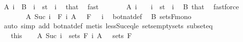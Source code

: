 \begin{isabellebody}
\ {\isachardoublequoteopen}A\ i\ {\isacharequal}{\kern0pt}\ B{\isachardoublequoteclose}\ \ {\isachardoublequoteopen}i\ {\isasymin}\ {\isacharbraceleft}{\kern0pt}s{\isacharless}{\kern0pt}{\isachardot}{\kern0pt}{\isachardot}{\kern0pt}t{\isacharbraceright}{\kern0pt}{\isachardoublequoteclose}\ \ i\ \isamarkupfalse%
\ that\ \isamarkupfalse%
\ fast\isanewline
\ \ \ \ \isamarkupfalse%
\ \isamarkupfalse%
\ {\isachardoublequoteopen}A\ i\ {\isacharequal}{\kern0pt}\ {\isacharbraceleft}{\kern0pt}{\isacharbraceright}{\kern0pt}{\isachardoublequoteclose}\ \ {\isachardoublequoteopen}i\ {\isasymnotin}\ {\isacharbraceleft}{\kern0pt}s{\isacharless}{\kern0pt}{\isachardot}{\kern0pt}{\isachardot}{\kern0pt}t{\isacharbraceright}{\kern0pt}{\isachardoublequoteclose}\ \ i\ \isamarkupfalse%
\ B\ that\ \isamarkupfalse%
\ fastforce\isanewline
\ \ \ \ \isamarkupfalse%
\ \isamarkupfalse%
\ {\isachardoublequoteopen}A\ {\isacharparenleft}{\kern0pt}Suc\ i{\isacharparenright}{\kern0pt}\ {\isasymin}\ F\ i{\isachardoublequoteclose}\ {\isachardoublequoteopen}A\ {}\ {\isasymin}\ F\ {}{\isachardoublequoteclose}\ \ i\ \isamarkupfalse%
\ bot{\isacharunderscore}{\kern0pt}nat{\isacharunderscore}{\kern0pt}def\ \isamarkupfalse%
\ B\ sets{\isacharunderscore}{\kern0pt}F{\isacharunderscore}{\kern0pt}mono\ \isamarkupfalse%
\ {\isacharparenleft}{\kern0pt}auto\ simp\ add{\isacharcolon}{\kern0pt}\ bot{\isacharunderscore}{\kern0pt}nat{\isacharunderscore}{\kern0pt}def{\isacharparenright}{\kern0pt}\ {\isacharparenleft}{\kern0pt}metis\ less{\isacharunderscore}{\kern0pt}Suc{\isacharunderscore}{\kern0pt}eq{\isacharunderscore}{\kern0pt}le\ sets{\isachardot}{\kern0pt}empty{\isacharunderscore}{\kern0pt}sets\ subset{\isacharunderscore}{\kern0pt}eq{\isacharparenright}{\kern0pt}\isanewline
\ \ \isacommand{{\isacharbraceright}{\kern0pt}}\isamarkupfalse%
\isanewline
\ \ \isamarkupfalse%
\ {\isacharasterisk}{\kern0pt}{\isacharasterisk}{\kern0pt}\ {\isacharequal}{\kern0pt}\ this\isanewline
\ \ \isamarkupfalse%
\ {\isachardoublequoteopen}A\ {\isacharparenleft}{\kern0pt}Suc\ i{\isacharparenright}{\kern0pt}\ {\isasymin}\ sets\ {\isacharparenleft}{\kern0pt}F\ i{\isacharparenright}{\kern0pt}{\isachardoublequoteclose}\ {\isachardoublequoteopen}A\ {}\ {\isasymin}\ sets\ {\isacharparenleft}{\kern0pt}F\ {}{\isacharparenright}{\kern0pt}{\isachardoublequoteclose}\ \isamarkupfalse%

\end{isabellebody}
